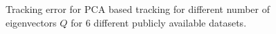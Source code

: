\begin{figure}[h!]
\caption{Tracking error for PCA based tracking for different number of eigenvectors $Q$ for 6 different publicly available datasets.}
\label{fig:results_final_pca_}
\end{figure}

\clearpage
\newpage
